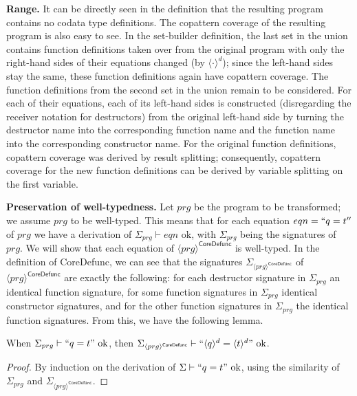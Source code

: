\textbf{Range.} It can be directly seen in the definition that the resulting program contains no codata type definitions. The copattern coverage of the resulting program is also easy to see. In the set-builder definition, the last set in the union contains function definitions taken over from the original program with only the right-hand sides of their equations changed (by $\langle \cdot \rangle^d$); since the left-hand sides stay the same, these function definitions again have copattern coverage. The function definitions from the second set in the union remain to be considered. For each of their equations, each of its left-hand sides is constructed (disregarding the receiver notation for destructors) from the original left-hand side by turning the destructor name into the corresponding function name and the function name into the corresponding constructor name. For the original function definitions, copattern coverage was derived by result splitting; consequently, copattern coverage for the new function definitions can be derived by variable splitting on the first variable.

\textbf{Preservation of well-typedness.} Let $prg$ be the program to be transformed; we assume $prg$ to be well-typed. This means that for each equation $eqn = `` q = t ''$ of $prg$ we have a derivation of $\Sigma_{prg} \vdash eqn \textrm{ ok}$, with $\Sigma_{prg}$ being the signatures of $prg$. We will show that each equation of $\langle prg \rangle^{\textsf{CoreDefunc}}$ is well-typed. In the definition of \textsf{CoreDefunc}, we can see that the signatures $\Sigma_{\langle prg \rangle^{\textsf{CoreDefunc}}}$ of $\langle prg \rangle^{\textsf{CoreDefunc}}$ are exactly the following: for each destructor signature in $\Sigma_{prg}$ an identical function signature, for some function signatures in $\Sigma_{prg}$ identical constructor signatures, and for the other function signatures in $\Sigma_{prg}$ the identical function signatures. From this, we have the following lemma.

\begin{lemma}
\label{lem:pwtdefunc}
When $\Sigma_{prg} \vdash `` q = t " \textrm{ ok}$, then $\Sigma_{\langle prg \rangle^{\textsf{CoreDefunc}}} \vdash `` \langle q \rangle^d = \langle t \rangle^d " \textrm{ ok}$.
\begin{proof}
By induction on the derivation of $\Sigma \vdash `` q = t " \textrm{ ok}$, using the similarity of $\Sigma_{prg}$ and $\Sigma_{\langle prg \rangle^{\textsf{CoreDefunc}}}$.
\end{proof}
\end{lemma}


